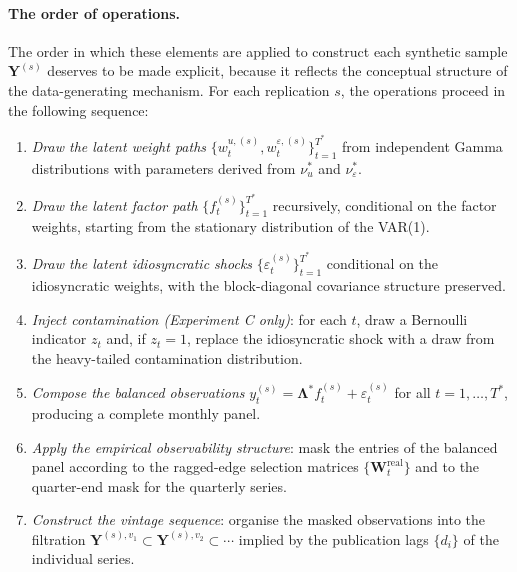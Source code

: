 \documentclass[11pt, a4paper, oneside]{article}
\newcommand{\mY}{\mathbf{Y}}
\newcommand{\mL}{\boldsymbol{\Lambda}}
\begin{document}
\paragraph{The order of operations.}
The order in which these elements are applied to construct each
synthetic sample $\mY^{(s)}$ deserves to be made explicit, because
it reflects the conceptual structure of the data-generating
mechanism. For each replication $s$, the operations proceed in
the following sequence:
\begin{enumerate}[leftmargin=1.5em, itemsep=4pt]
    \item \emph{Draw the latent weight paths}
          $\{w_t^{u, (s)}, w_t^{\varepsilon, (s)}\}_{t=1}^{T^*}$
          from independent Gamma distributions with parameters
          derived from $\nu_u^*$ and $\nu_\varepsilon^*$.
    \item \emph{Draw the latent factor path}
          $\{f_t^{(s)}\}_{t=1}^{T^*}$ recursively, conditional on
          the factor weights, starting from the stationary
          distribution of the VAR(1).
    \item \emph{Draw the latent idiosyncratic shocks}
          $\{\varepsilon_t^{(s)}\}_{t=1}^{T^*}$ conditional on the
          idiosyncratic weights, with the block-diagonal
          covariance structure preserved.
    \item \emph{Inject contamination (Experiment C only)}: for
          each $t$, draw a Bernoulli indicator $z_t$ and, if
          $z_t = 1$, replace the idiosyncratic shock with a draw
          from the heavy-tailed contamination distribution.
    \item \emph{Compose the balanced observations}
          $y_t^{(s)} = \mL^* f_t^{(s)} + \varepsilon_t^{(s)}$
          for all $t = 1, \ldots, T^*$, producing a complete
          monthly panel.
    \item \emph{Apply the empirical observability structure}: mask
          the entries of the balanced panel according to the
          ragged-edge selection matrices
          $\{\mathbf{W}_t^{\mathrm{real}}\}$ and to the
          quarter-end mask for the quarterly series.
    \item \emph{Construct the vintage sequence}: organise the
          masked observations into the filtration
          $\mathbf{Y}^{(s), v_1} \subset \mathbf{Y}^{(s), v_2} \subset \cdots$
          implied by the publication lags
          $\{d_i\}$ of the individual series.
\end{enumerate}
\end{document}
